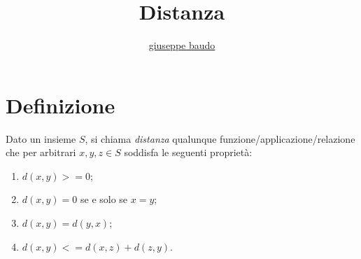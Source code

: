 \documentclass[a4paper,10pt]{article}
\title{Distanza}
\author{\href{http://www.baudo.hol.es}{giuseppe baudo}}
\begin{document}
\maketitle

\section{Definizione}
Dato un insieme $S$, si chiama \textit{distanza} qualunque funzione/applicazione/relazione che per arbitrari $x, y, z \in S$ soddisfa le seguenti proprietà:

\begin{enumerate}
 \item $d(x, y) >= 0$;
 \item $d(x, y) = 0$ se e solo se $x=y$;
 \item $d(x, y) = d(y, x)$;
 \item $d(x, y) <= d(x, z) + d(z, y)$.
\end{enumerate}
\end{document}
